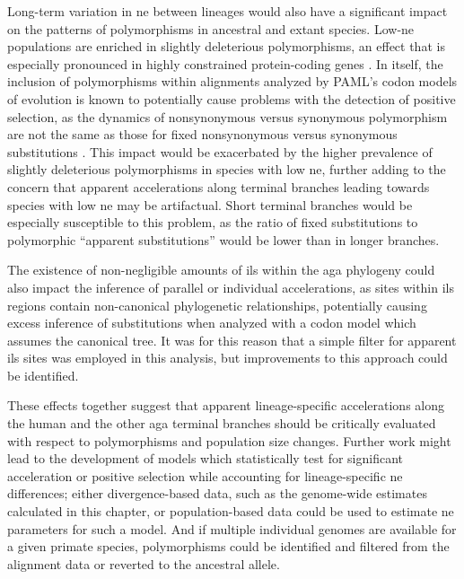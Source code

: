 Long-term variation in \ac{ne} between lineages would also have a
significant impact on the patterns of polymorphisms in ancestral and
extant species. Low-\ac{ne} populations are enriched in slightly
deleterious polymorphisms, an effect that is especially pronounced in
highly constrained protein-coding genes \citep{Subramanian2011}. In
itself, the inclusion of polymorphisms within alignments analyzed by
PAML's codon models of evolution is known to potentially cause
problems with the detection of positive selection, as the dynamics of
nonsynonymous versus synonymous polymorphism are not the same as those
for fixed nonsynonymous versus synonymous substitutions
\citep{Kryazhimskiy2008}. This impact would be exacerbated by the
higher prevalence of slightly deleterious polymorphisms in species
with low \ac{ne}, further adding to the concern that apparent
accelerations along terminal branches leading towards species with low
\ac{ne} may be artifactual. Short terminal branches would be
especially susceptible to this problem, as the ratio of fixed
substitutions to polymorphic ``apparent substitutions'' would be lower
than in longer branches.

The existence of non-negligible amounts of \ac{ils} within the
\ac{aga} phylogeny could also impact the inference of parallel or
individual accelerations, as sites within \ac{ils} regions contain
non-canonical phylogenetic relationships, potentially causing excess
inference of substitutions when analyzed with a codon model which
assumes the canonical tree. It was for this reason that a simple
filter for apparent \ac{ils} sites was employed in this analysis, but
improvements to this approach could be identified.

These effects together suggest that apparent lineage-specific
accelerations along the human and the other \ac{aga} terminal branches
should be critically evaluated with respect to polymorphisms and
population size changes. Further work might lead to the development of
models which statistically test for significant \dnds acceleration or
positive selection while accounting for lineage-specific \ac{ne}
differences; either divergence-based data, such as the genome-wide
\dnds estimates calculated in this chapter, or population-based data
could be used to estimate \ac{ne} parameters for such a model. And if
multiple individual genomes are available for a given primate species,
polymorphisms could be identified and filtered from the alignment data
or reverted to the ancestral allele.

